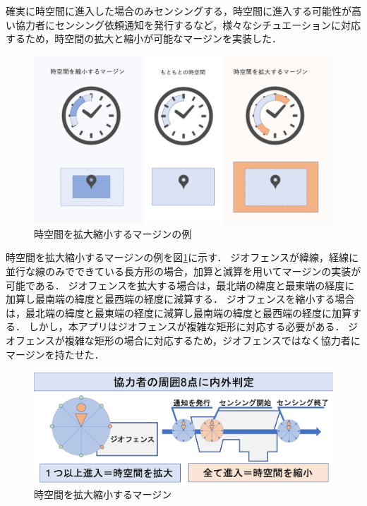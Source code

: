 確実に時空間に進入した場合のみセンシングする，時空間に進入する可能性が高い協力者にセンシング依頼通知を発行するなど，様々なシチュエーションに対応するため，時空間の拡大と縮小が可能なマージンを実装した．

\begin{figure}[tbh]
    \centering
    \includegraphics[width=16cm]{img_margin_1.png}
    \caption{時空間を拡大縮小するマージンの例}
    \label{fig:margin_1}
\end{figure}

時空間を拡大縮小するマージンの例を図\ref{fig:margin_1}に示す．
ジオフェンスが緯線，経線に並行な線のみでできている長方形の場合，加算と減算を用いてマージンの実装が可能である．
ジオフェンスを拡大する場合は，最北端の緯度と最東端の経度に加算し最南端の緯度と最西端の経度に減算する．
ジオフェンスを縮小する場合は，最北端の緯度と最東端の経度に減算し最南端の緯度と最西端の経度に加算する．
しかし，本アプリはジオフェンスが複雑な矩形に対応する必要がある．
ジオフェンスが複雑な矩形の場合に対応するため，ジオフェンスではなく協力者にマージンを持たせた．

\begin{figure}[tbh]
    \centering
    \includegraphics[width=16cm]{img_margin_2.png}
    \caption{時空間を拡大縮小するマージン}
    \label{fig:margin_2}
\end{figure}

